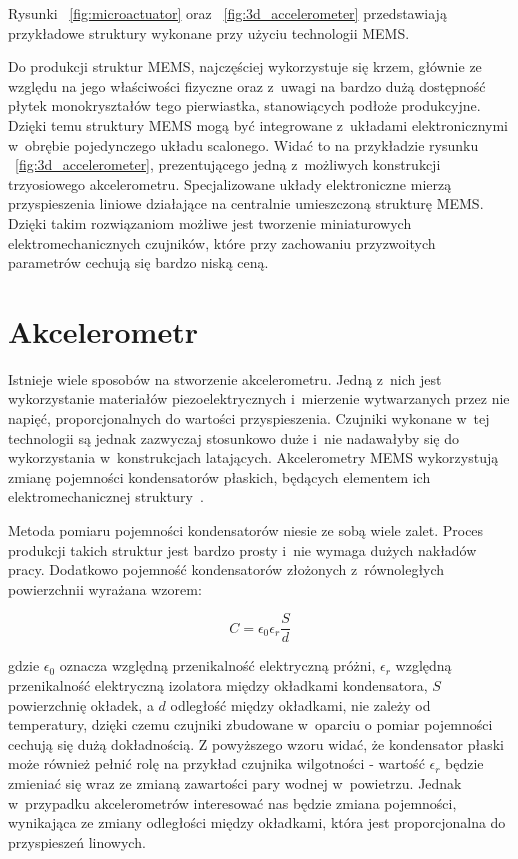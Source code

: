 \documentclass[11pt, twoside]{Thesis} %
\begin{document}
Rysunki ~\ref{fig:microactuator} oraz ~\ref{fig:3d_accelerometer} przedstawiają przykładowe struktury wykonane przy użyciu technologii MEMS. 

Do produkcji struktur MEMS, najczęściej wykorzystuje się krzem, głównie ze względu na jego właściwości fizyczne oraz z~uwagi na bardzo dużą dostępność płytek monokryształów tego pierwiastka, stanowiących podłoże produkcyjne. Dzięki temu struktury MEMS mogą być integrowane z~układami elektronicznymi w~obrębie pojedynczego układu scalonego. Widać to na przykładzie rysunku ~\ref{fig:3d_accelerometer}, prezentującego jedną z~możliwych konstrukcji trzyosiowego akcelerometru. Specjalizowane układy elektroniczne mierzą przyspieszenia liniowe działające na centralnie umieszczoną strukturę MEMS. Dzięki takim rozwiązaniom możliwe jest tworzenie miniaturowych elektromechanicznych czujników, które przy zachowaniu przyzwoitych parametrów cechują się bardzo niską ceną.   

\section{Akcelerometr}

Istnieje wiele sposobów na stworzenie akcelerometru. Jedną z~nich jest wykorzystanie materiałów piezoelektrycznych i~mierzenie wytwarzanych przez nie napięć, proporcjonalnych do wartości przyspieszenia. Czujniki wykonane w~tej technologii są jednak zazwyczaj stosunkowo duże i~nie nadawałyby się do wykorzystania w~konstrukcjach latających. Akcelerometry MEMS wykorzystują zmianę pojemności kondensatorów płaskich, będących elementem ich elektromechanicznej struktury~\cite{mems12}.

Metoda pomiaru pojemności kondensatorów niesie ze sobą wiele zalet. Proces produkcji takich struktur jest bardzo prosty i~nie wymaga dużych nakładów pracy. Dodatkowo pojemność kondensatorów złożonych z~równoległych powierzchnii wyrażana wzorem:   

\begin{equation}
C = \epsilon_0\epsilon_r\frac{S}{d}
\end{equation}

gdzie $\epsilon_0$ oznacza względną przenikalność elektryczną próżni, $\epsilon_r$ względną przenikalność elektryczną izolatora między okładkami kondensatora, $S$ powierzchnię okładek, a $d$ odległość między okładkami, nie zależy od temperatury, dzięki czemu czujniki zbudowane w~oparciu o pomiar pojemności cechują się dużą dokładnością. Z powyższego wzoru widać, że kondensator płaski może również pełnić rolę na przykład czujnika wilgotności - wartość $\epsilon_r$ będzie zmieniać się wraz ze zmianą zawartości pary wodnej w~powietrzu. Jednak w~przypadku akcelerometrów interesować nas będzie zmiana pojemności, wynikająca ze zmiany odległości między okładkami, która jest proporcjonalna do przyspieszeń linowych.
\end{document}
